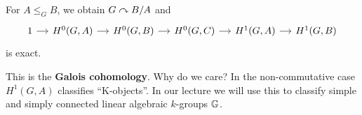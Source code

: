 \begin{outline}
\begin{proposition}
    For $A\leq_G B$, we obtain $G\curvearrowright B/A$ and 
    $$\begin{tikzcd}[column sep=small]
    1 \arrow[r] & H^0(G,A) \arrow[r] & H^0(G,B) \arrow[r] & H^0(G,C) \arrow[r] & H^1(G,A) \arrow[r] & H^1(G,B)
    \end{tikzcd}$$
    is exact.
\end{proposition}

This is the \textbf{Galois cohomology}. Why do we care? In the non-commutative case $H^1(G,A)$ classifies \enquote{K-objects}. In our lecture we will use this to classify simple and simply connected linear algebraic $k$-groups $\mathbb{G}$.

\end{outline}



 